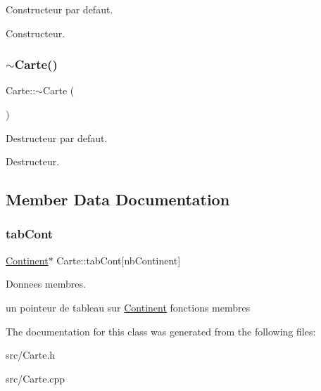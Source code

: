 Constructeur par defaut. 

Constructeur. \mbox{\label{classCarte_a63300ff55c58b5d5b1674a3fc8f25910}} 
\subsubsection{\texorpdfstring{$\sim$\+Carte()}{~Carte()}}
{\footnotesize\ttfamily Carte\+::$\sim$\+Carte (\begin{DoxyParamCaption}{ }\end{DoxyParamCaption})}



Destructeur par defaut. 

Destructeur. 

\subsection{Member Data Documentation}
\mbox{\label{classCarte_a327521a757eb3b89e961e4d6bc9a4d7a}} 
\subsubsection{\texorpdfstring{tab\+Cont}{tabCont}}
{\footnotesize\ttfamily \mbox{\hyperlink{classContinent}{Continent}}$\ast$ Carte\+::tab\+Cont\mbox{[}nb\+Continent\mbox{]}}



Donnees membres. 

un pointeur de tableau sur \mbox{\hyperlink{classContinent}{Continent}} fonctions membres 

The documentation for this class was generated from the following files\+:\begin{DoxyCompactItemize}
\item 
src/Carte.\+h\item 
src/Carte.\+cpp\end{DoxyCompactItemize}
